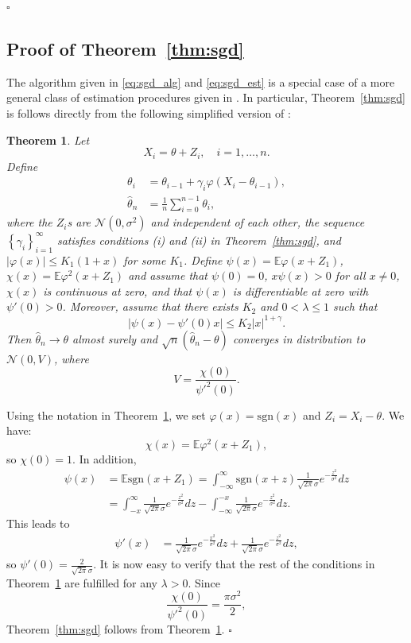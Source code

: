 \documentclass[letterpaper, conference]{IEEEtran}      %
\newtheorem{thm}{\bf{Theorem}}
\newcommand{\sgn}{\mathrm{sgn} }
\newcommand*{\QEDA}{\hfill\ensuremath{\square}}
\begin{document}
\QEDA

\subsection*{Proof of Theorem~\ref{thm:sgd}}
The algorithm given in \eqref{eq:sgd_alg} and \eqref{eq:sgd_est} is a special case of a more general class of estimation procedures given in \cite{polyak1992acceleration}. In particular, Theorem~\ref{thm:sgd} is follows directly from the following simplified version of \cite[Thm. 4]{polyak1992acceleration}:
\begin{thm}{\cite[Thm. 4]{polyak1992acceleration}} \label{thm:polyak_juditsky}
Let 
\[
X_i = \theta + Z_i,\quad i=1,\ldots,n.
\]
Define 
\begin{align*}
\theta_i & = \theta_{i-1} + \gamma_i \varphi(X_i - \theta_{i-1}), \\
\widehat{\theta}_n & = \frac{1}{n} \sum_{i=0}^{n-1} \theta_i,
\end{align*}
where the $Z_i$s are $\mathcal N(0,\sigma^2)$ and independent of each other, the sequence $\left\{ \gamma_i \right\}_{i=1}^\infty$ satisfies conditions (i) and (ii) in Theorem~\ref{thm:sgd}, and $\left| \varphi(x) \right| \leq K_1(1+x)$ for some $K_1$. Define $\psi(x) = \mathbb E \varphi(x+Z_1)$, $\chi(x) = \mathbb E \varphi^2(x+Z_1)$ and assume that $\psi(0)=0$, $x\psi(x) >0$ for all $x\neq 0$, $\chi(x)$ is continuous at zero, and that $\psi(x)$ is differentiable at zero with $\psi'(0)>0$. Moreover, assume that there exists $K_2$ and $0<\lambda \leq 1$ such that
\[
\left| \psi(x) - \psi'(0)x \right|\leq K_2 |x|^{1+\gamma}.
\]
Then $\widehat{\theta}_n \rightarrow \theta$ almost surely and $ \sqrt{n}(\widehat{\theta}_n - \theta)$ converges in distribution to $\mathcal N(0,V)$, where
\[
V = \frac{ \chi(0)} {\psi'^2(0)}. 
\]
\end{thm}


Using the notation in Theorem~\ref{thm:polyak_juditsky}, we set $\varphi(x) = \sgn(x)$ and $Z_i = X_i - \theta$. We have: 
\[
\chi(x) = \mathbb E \varphi^2(x+Z_1),
\]
so $\chi(0) = 1$. In addition,
\begin{align*}
\psi(x) & = \mathbb E \sgn(x+ Z_1) = \int_{-\infty}^\infty \sgn(x+z) \frac{1}{\sqrt{2\pi}\sigma} e^{-\frac{z^2}{\sigma^2}} dz \\
& = \int_{-x}^\infty \frac{1}{\sqrt{2\pi}\sigma} e^{-\frac{z^2}{\sigma^2}} dz -\int_{-\infty}^{-x} \frac{1}{\sqrt{2\pi}\sigma} e^{-\frac{z^2}{\sigma^2}} dz.
\end{align*}
This leads to 
\begin{align*}
\psi'(x) & = \frac{1}{\sqrt{2\pi}\sigma} e^{-\frac{x^2}{\sigma^2}} dz +\frac{1}{\sqrt{2\pi}\sigma} e^{-\frac{z^2}{\sigma^2}} dz,
\end{align*}
so $\psi'(0) = \frac{2}{\sqrt{2\pi}\sigma}$. It is now easy to verify that the rest of the conditions in Theorem~\ref{thm:polyak_juditsky} are fulfilled for any $\lambda > 0$. Since 
\[
\frac{\chi(0)}{\psi'^2(0)} = \frac{\pi \sigma^2}{2},
\]
Theorem~\ref{thm:sgd} follows from Theorem~\ref{thm:polyak_juditsky}. \QEDA
\end{document}
